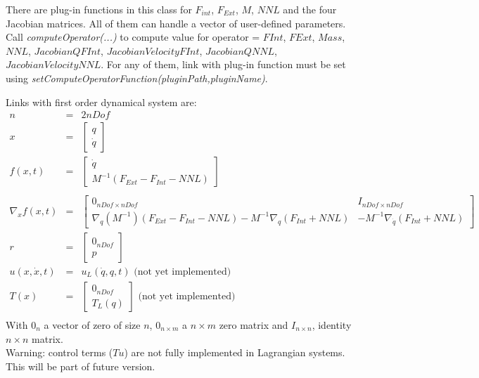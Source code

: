 \documentclass[10pt]{article}
\begin{document}
There are plug-in functions in this class for $F_{int}$, $F_{Ext}$, $M$, $NNL$ and the four Jacobian matrices. All
of them can handle a vector of user-defined parameters. \\
Call \textit{computeOperator(...)} to compute value for operator = {$FInt$, $FExt$, $Mass$, $NNL$, $JacobianQFInt$, $JacobianVelocityFInt$, $JacobianQNNL$,$JacobianVelocityNNL$}. For any of them, link with plug-in function must be set using \textit{setComputeOperatorFunction(pluginPath,pluginName)}.

Links with first order dynamical system are: 
\begin{eqnarray}
  n &= &2nDof \\
  x &=&\left[\begin{array}{c}q \\ \dot q \end{array}\right] \\
  f(x,t) &=&  \left[\begin{array}{c} \dot q \\ M^{-1}(F_{Ext}-F_{Int}-NNL) \end{array}\right] \\
  \\
  \nabla_x f(x,t) &=& 
  \left[\begin{array}{cc} 
      0_{nDof\times nDof} & I_{nDof\times nDof} \\
      \nabla_q(M^{-1})(F_{Ext}-F_{Int}-NNL) -M^{-1}\nabla_q(F_{Int}+NNL) &  -M^{-1}\nabla_{\dot q}(F_{Int}+NNL) 
    \end{array}\right] \\
  r &=& \left[\begin{array}{c} 0_{nDof} \\ p \end{array}\right] \\
  u(x,\dot x,t) &=& u_L(\dot q, q, t) \text{  (not yet implemented)} \\
  T(x) &=& \left[\begin{array}{c} 0_{nDof} \\ T_L(q) \end{array}\right] \text{  (not yet implemented)} \\
\end{eqnarray}
With $0_{n}$ a vector of zero of size $n$, $0_{n\times m}$ a $n\times m$ zero matrix and
$I_{n\times n}$, identity $n\times n$ matrix. \\

Warning: control terms ($Tu$) are not fully implemented in Lagrangian systems. This will be part of future version.
\end{document}
